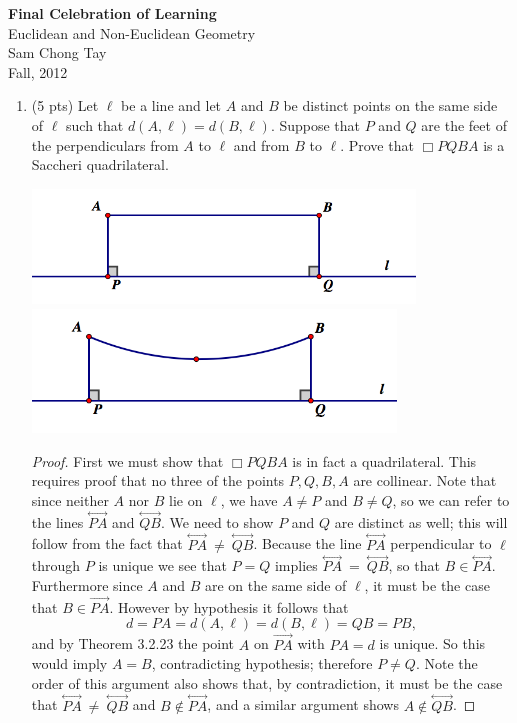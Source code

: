 \documentclass[12pt]{article}
\newcommand{\ray}[1]{\overrightarrow{#1}}
\renewcommand{\line}[1]{\stackrel{\longleftrightarrow}{#1}}
\newcommand{\qd}{\Box}
\begin{document}
\begin{center}
{\bf Final Celebration of Learning}\\
Euclidean and Non-Euclidean Geometry\\
Sam Chong Tay\\
Fall, 2012
\end{center}


\begin{enumerate}
\item (5 pts) Let $\ell$ be a line and let $A$ and $B$ be distinct points on the same side of $\ell$ such that $d(A, \ell) = d(B, \ell)$.  Suppose that $P$ and $Q$ are the feet of the perpendiculars from $A$ to $\ell$ and from $B$ to $\ell$.  Prove that $\qd PQBA$ is a Saccheri quadrilateral. 
\begin{center}
\includegraphics[width=4in]{1a.png}
\includegraphics[width=3.8in]{1b.png}

\end{center}

\begin{proof}
First we must show that $\qd PQBA$ is in fact a quadrilateral. This requires proof that no three of the points $P,Q,B,A$ are collinear. Note that since neither $A$ nor $B$ lie on $\ell$, we have $A\ne P$ and $B\ne Q$, so we can refer to the lines $\line{PA}$ and $\line{QB}$. We need to show $P$ and $Q$ are distinct as well; this will follow from the fact that $\line{PA} \ \ne \ \line{QB}$. Because the line $\line{PA}$ perpendicular to $\ell$ through $P$ is unique we see that $P=Q$ implies $\line{PA} \ = \ \line{QB}$, so that $B\in \line{PA}$. Furthermore since $A$ and $B$ are on the same side of $\ell$, it must be the case that $B\in\ray{PA}$. However by hypothesis it follows that $$d=PA=d(A,\ell)=d(B,\ell)=QB=PB,$$ and by Theorem 3.2.23 the point $A$ on $\ray{PA}$ with $PA=d$ is unique. So this would imply $A=B$, contradicting hypothesis; therefore $P\ne Q$. Note the order of this argument also shows that, by contradiction, it must be the case that $\line{PA} \ \ne \ \line{QB}$ and $B\notin \line{PA}$,  and a similar argument shows $A\notin\line{QB}$.


\end{proof}
\end{enumerate}
\end{document}
